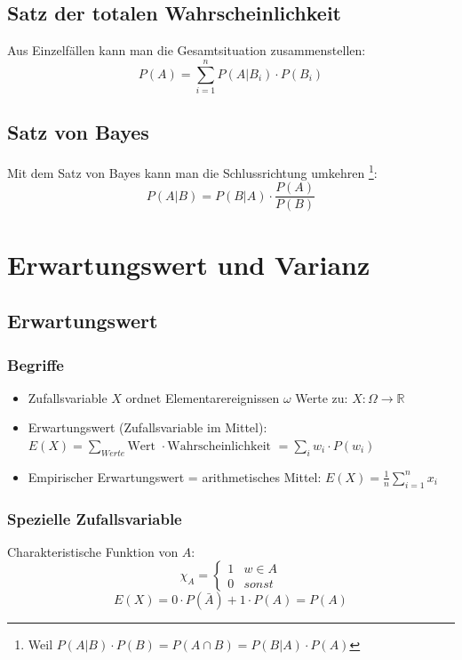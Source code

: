 \subsection{Satz der totalen Wahrscheinlichkeit}
Aus Einzelfällen kann man die Gesamtsituation zusammenstellen:
\[ P(A) = \sum_{i=1}^{n}P(A|B_i) \cdot P(B_i) \]

\subsection{Satz von Bayes}
Mit dem Satz von Bayes kann man die Schlussrichtung umkehren
\footnote{Weil $P(A|B) \cdot P(B) = P(A \cap B) = P(B|A) \cdot P(A)$}:
\[ P(A|B) = P(B|A) \cdot \frac{P(A)}{P(B)} \]

\section{Erwartungswert und Varianz}
\subsection{Erwartungswert}
\subsubsection{Begriffe}
\begin{itemize}
  \item Zufallsvariable $X$ ordnet Elementarereignissen $\omega$ Werte
    zu: $X: \Omega \rightarrow \mathbb{R}$
  \item Erwartungswert (Zufallsvariable im Mittel): \\
    $E(X) = \sum_{Werte} \text{Wert } \cdot
    \text{Wahrscheinlichkeit } = \sum_i w_i \cdot P(w_i)$
  \item Empirischer Erwartungswert = arithmetisches Mittel:
    $E(X) = \frac{1}{n} \sum_{i=1}^n x_i$
\end{itemize}
\subsubsection{Spezielle Zufallsvariable}
Charakteristische Funktion von $A$:
\[ \chi_A = \begin{cases}1 & w \in A \\ 0 & sonst \end{cases} \]
\[ E(X) = 0 \cdot P(\bar{A}) + 1 \cdot P(A) = P(A) \]

